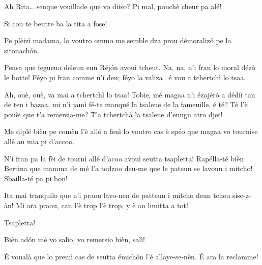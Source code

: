 \begin{drama}
\Tobiespeaks Ah Rita\ldots {} senque vouillade que vo diiso? Pi mal, pouchè cheur pa alé!

\Bertinaspeaks Si cou te beutte ba la tita a fose!

\Ritaspeaks Pe plèizì madama, lo voutro ommo me semble dza prou démoralizó pe la sitouachón.

\Tobiespeaks Pensa que fegueua deleun eun Réjón avouì tcheut. Na, na, n’i fran lo moral dézò le botte! Féyo pi fran comme n’i deu; féyo la valiza \valigia\ é vou a tchertchì lo tsaa.

\Bertinaspeaks Ah, ouè, ouè, va mai a tchertchì lo tsaa! Tobie, mé magaa n’i ézajéró a dédiì tan de ten i bazaa, mi n’i jamì fé-te manqué la tsaleue de la fameuille, é té? Té l’è pouèi que t’a remersia-me? T’a tchertchà la tsaleue d’eungn atro djet!

\Ritaspeaks Me diplé bièn pe comèn l’è alló a fenì lo voutro cas è spéo que magaa vo tournise allé an mia pi d’accoo.

\Tobiespeaks N’i fran pa la fèi de tournì allé d’acoo avouì seutta tsapletta! Rapélla-té bièn Bertina que mamma de mé l’a todzoo deu-me que le pateun se lavoun i mitcho! Sbailla-té pa pi bon!

\Bertinaspeaks Ita mai tranquilo que n’i praou lavo-nen de patteun i mitcho deun tcheu sise-z-àn! Mi ara praou, can l’è trop l’è trop, y è an limitta a tot!

\Tobiespeaks Tsapletta!

\Ritaspeaks Bièn ad\'on mé vo salio, vo remersio bièn, salì!


\Ritaspeaks É voualà que lo premì cas de seutta émichón l'é allaye-se-nèn. \'E ara la reclamme!




\end{drama}
